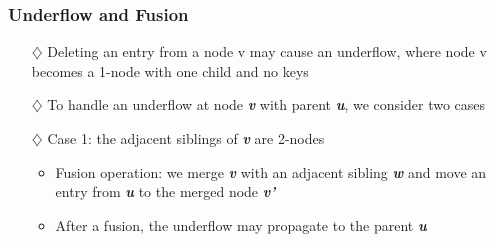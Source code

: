 \documentclass[pdf,
serif,
compress,
xcolor=table,
dvipsnames,
spanish,
aspectratio=169]{beamer}
\begin{document}
\begin{frame}
\end{frame}

\begin{frame}
    \frametitle{Underflow and Fusion}
    \begin{itemize} \color{purpura}
        \item[\(\diamondsuit\)] Deleting an entry from a node v may cause an \textcolor{naranja}{underflow}, where node v becomes a 1-node with one child and no keys
        \item[\(\diamondsuit\)] To handle an underflow at node \textbf{\textit{v}} with parent \textbf{\textit{u}}, we consider two cases
        \item[\(\diamondsuit\)] \textcolor{naranja}{Case 1:} the adjacent siblings of \textbf{\textit{v}} are 2-nodes
        \begin{itemize} \color{purpura}
            \item \textcolor{naranja}{Fusion operation:} we merge \textbf{\textit{v}} with an adjacent sibling \textbf{\textit{w}} and move an entry from \textbf{\textit{u}} to the merged node \textbf{\textit{v'}}

            \item After a fusion, the underflow may propagate to the parent \textbf{\textit{u}}
        \end{itemize}
    \end{itemize}


\end{frame}
\end{document}
